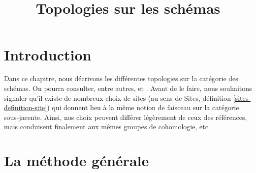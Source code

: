 

%


\title{Topologies sur les schémas}

\maketitle

\label{section-phantom}

\tableofcontents



\section{Introduction}
\label{section-introduction}

\noindent
Dans ce chapitre, nous décrivons les différentes topologies sur la
catégorie des schémas. On pourra consulter, entre autres, \cite{SGA1} et \cite{Ner}.
Avant de le faire, nous souhaitons signaler qu'il existe de nombreux
choix de sites (au sens de
Sites, définition \ref{sites-definition-site}) qui donnent lieu à
la même notion de faisceau sur la catégorie sous-jacente. Ainsi,
nos choix peuvent différer légèrement de ceux des références,
mais conduisent finalement aux mêmes groupes de cohomologie, etc.

\section{La méthode générale}
\label{section-procedure}

